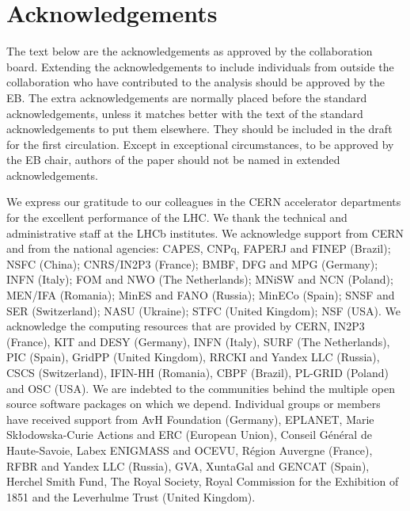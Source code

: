 
\chapter*{Acknowledgements}

The text below are the acknowledgements as approved by the collaboration
board. Extending the acknowledgements to include individuals from outside the
collaboration who have contributed to the analysis should be approved by the
EB. The extra acknowledgements are normally placed before the standard 
acknowledgements, unless it matches better with the text of the standard 
acknowledgements to put them elsewhere. They should be included in the draft 
for the first circulation. Except in exceptional circumstances, to be approved by the
EB chair, authors of the paper should not be named in extended acknowledgements.
 
\noindent We express our gratitude to our colleagues in the CERN
accelerator departments for the excellent performance of the LHC. We
thank the technical and administrative staff at the LHCb
institutes. We acknowledge support from CERN and from the national
agencies: CAPES, CNPq, FAPERJ and FINEP (Brazil); NSFC (China);
CNRS/IN2P3 (France); BMBF, DFG and MPG (Germany); INFN (Italy); 
FOM and NWO (The Netherlands); MNiSW and NCN (Poland); MEN/IFA (Romania); 
MinES and FANO (Russia); MinECo (Spain); SNSF and SER (Switzerland); 
NASU (Ukraine); STFC (United Kingdom); NSF (USA).
We acknowledge the computing resources that are provided by CERN, IN2P3 (France), KIT and DESY (Germany), INFN (Italy), SURF (The Netherlands), PIC (Spain), GridPP (United Kingdom), RRCKI and Yandex LLC (Russia), CSCS (Switzerland), IFIN-HH (Romania), CBPF (Brazil), PL-GRID (Poland) and OSC (USA). We are indebted to the communities behind the multiple open 
source software packages on which we depend.
Individual groups or members have received support from AvH Foundation (Germany),
EPLANET, Marie Sk\l{}odowska-Curie Actions and ERC (European Union), 
Conseil G\'{e}n\'{e}ral de Haute-Savoie, Labex ENIGMASS and OCEVU, 
R\'{e}gion Auvergne (France), RFBR and Yandex LLC (Russia), GVA, XuntaGal and GENCAT (Spain), Herchel Smith Fund, The Royal Society, Royal Commission for the Exhibition of 1851 and the Leverhulme Trust (United Kingdom).
